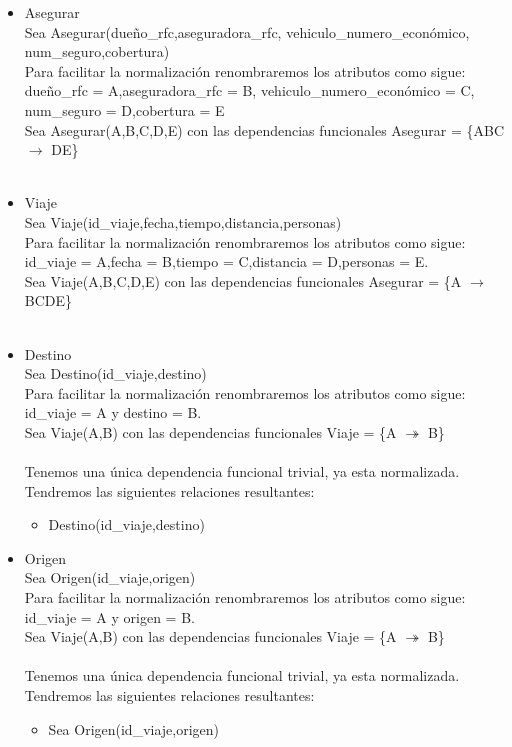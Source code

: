 \documentclass{article}
\begin{document}
\begin{itemize}
\item Asegurar\\
Sea Asegurar(dueño\_rfc,aseguradora\_rfc, vehiculo\_numero\_económico, num\_seguro,cobertura)\\
Para facilitar la normalización renombraremos los atributos como sigue:
dueño\_rfc = A,aseguradora\_rfc = B, vehiculo\_numero\_económico = C, num\_seguro = D,cobertura = E\\
Sea Asegurar(A,B,C,D,E) con las dependencias funcionales 
Asegurar = \{ABC $\rightarrow$ DE\} \\
\\


\item Viaje\\
Sea Viaje(id\_viaje,fecha,tiempo,distancia,personas)\\
Para facilitar la normalización renombraremos los atributos como sigue:
id\_viaje = A,fecha = B,tiempo = C,distancia = D,personas = E.\\
Sea Viaje(A,B,C,D,E) con las dependencias funcionales
Asegurar = \{A $\rightarrow$ BCDE\} \\
\\



\item Destino\\
Sea Destino(id\_viaje,destino)\\
Para facilitar la normalización renombraremos los atributos como sigue:
id\_viaje = A y destino = B.\\
Sea Viaje(A,B) con las dependencias funcionales
Viaje = \{A $\twoheadrightarrow$ B\} \\
\\
Tenemos una única dependencia funcional trivial, ya esta normalizada.
Tendremos las siguientes relaciones resultantes:
\begin{itemize}
\item Destino(id\_viaje,destino)\\
\end{itemize}

\item Origen\\
Sea Origen(id\_viaje,origen)\\
Para facilitar la normalización renombraremos los atributos como sigue:
id\_viaje = A y origen = B.\\
Sea Viaje(A,B) con las dependencias funcionales
Viaje = \{A $\twoheadrightarrow$ B\} \\
\\
Tenemos una única dependencia funcional trivial, ya esta normalizada.
Tendremos las siguientes relaciones resultantes:
\begin{itemize}
\item Sea Origen(id\_viaje,origen)\\
\end{itemize}


\end{itemize}
\end{document}

